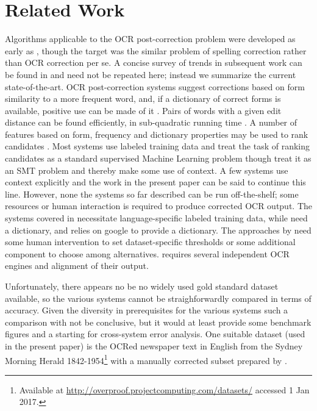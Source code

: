 \documentclass{sig-alternate}
\begin{document}
\section{Related Work}
\label{related}
Algorithms applicable to the OCR post-correction problem were
developed as early as \cite{ocr:Damerau}, though the target was the
similar problem of spelling correction rather than OCR correction per
se. A concise survey of trends in subsequent work can be found in
\cite[6-13]{ocr:Niklas} \cite[1347-1348]{ocr:Reffle} and need not be
repeated here; instead we summarize the current state-of-the-art. OCR
post-correction systems suggest corrections based on form similarity
to a more frequent word, and, if a dictionary of correct forms is
available, positive use can be made of it \cite{ocr:Eger}. Pairs of
words with a given edit distance can be found efficiently, in
sub-quadratic running time
\cite{ocr:Reynaert:Corpus-Clean,cs:Boytsov}. A number of features
based on form, frequency and dictionary properties may be used to rank
candidates \cite{ocr:Evershed}. Most systems use labeled training data
and treat the task of ranking candidates as a standard supervised
Machine Learning problem \cite{ocr:Reffle,ocr:Mei} though
\cite{ocr:Afli,ocr:AfliWay} treat it as an SMT problem and thereby
make some use of context. A few systems use context explicitly
\cite{ocr:Tong,ocr:Evershed} and the work in the present paper can be
said to continue this line. However, none the systems so far described
can be run off-the-shelf; some resources or human interaction is
required to produce corrected OCR output. The systems covered in
\cite{ocr:Afli,ocr:AfliWay,ocr:Reffle,ocr:Mei,ocr:Eger} necessitate
language-specific labeled training data, while
\cite{ocr:Kettunen,ocr:KissosDershowitz} need a dictionary, and
\cite{ocr:Bassil} relies on google to provide a dictionary.  The
approaches by \cite{ocr:Evershed,ocr:Reynaert:2016,ocr:Tong} need some
human intervention to set dataset-specific thresholds or some
additional component to choose among alternatives. \cite{ocr:Lund}
requires several independent OCR engines and alignment of their
output.

Unfortunately, there appears no be no widely used gold standard
dataset available, so the various systems cannot be straighforwardly
compared in terms of accuracy. Given the diversity in prerequisites
for the various systems such a comparison with not be conclusive, but
it would at least provide some benchmark figures and a starting for
cross-system error analysis. One suitable dataset (used in the present
paper) is the OCRed newspaper text in English from the Sydney Morning
Herald 1842-1954\footnote{Available at
  \url{http://overproof.projectcomputing.com/datasets/} accessed 1 Jan
  2017.} with a manually corrected subset prepared by
\cite{ocr:Evershed}.
\end{document}
